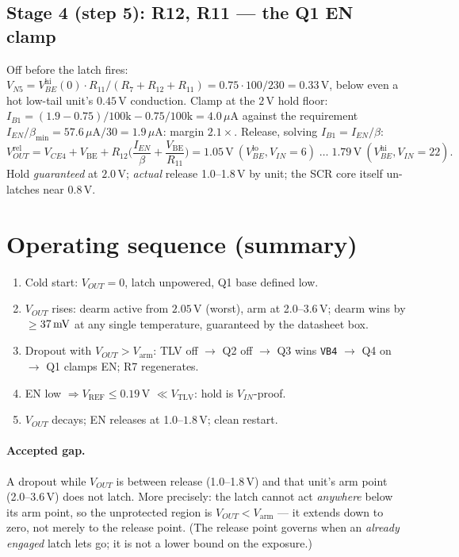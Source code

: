 \documentclass[11pt]{article}
\newcommand{\volt}{\mathrm{V}}\newcommand{\ampere}{\mathrm{A}}
\newcommand{\SI}[2]{\ensuremath{#1\,#2}}
\newcommand{\Vref}{V_{\mathrm{REF}}}
\newcommand{\Vtlv}{V_{\mathrm{TLV}}}
\newcommand{\Vbe}{V_{\mathrm{BE}}}
\newcommand{\Vout}{V_{OUT}}
\newcommand{\Vin}{V_{IN}}
\newcommand{\Varm}{V_{\mathrm{arm}}}
\newcommand{\uA}{\,\mu\mathrm{A}}
\newcommand{\vlo}{V_{BE}^{\mathrm{lo}}}
\newcommand{\vhi}{V_{BE}^{\mathrm{hi}}}
\begin{document}
\subsection{Stage 4 (step 5): R12, R11 --- the Q1 EN clamp}

Off before the latch fires: $V_{N5}=\vhi(0)\cdot R_{11}/(R_7{+}R_{12}{+}R_{11})
=0.75\cdot100/230=\SI{0.33}{\volt}$, below even a hot low-tail unit's
\SI{0.45}{\volt} conduction. Clamp at the \SI{2}{\volt} hold floor:
$I_{B1}=(1.9-0.75)/100\mathrm{k}-0.75/100\mathrm{k}=4.0\uA$ against the
requirement $I_{EN}/\beta_{\min}=57.6\uA/30=1.9\uA$: margin $2.1\times$.
Release, solving $I_{B1}=I_{EN}/\beta$:
\begin{equation}
\Vout^{\mathrm{rel}}=V_{CE4}+\Vbe+R_{12}\Big(\frac{I_{EN}}{\beta}
+\frac{\Vbe}{R_{11}}\Big)
=\SI{1.05}{\volt}\ (\vlo,\Vin{=}6)\;\ldots\;\SI{1.79}{\volt}\ (\vhi,\Vin{=}22).
\end{equation}
Hold \emph{guaranteed} at \SI{2.0}{\volt}; \emph{actual} release 1.0--1.8\,V by
unit; the SCR core itself un-latches near \SI{0.8}{\volt}.

\section{Operating sequence (summary)}

\begin{enumerate}[nosep]
\item Cold start: $\Vout=0$, latch unpowered, Q1 base defined low.
\item $\Vout$ rises: dearm active from \SI{2.05}{\volt} (worst), arm at
      2.0--\SI{3.6}{\volt}; dearm wins by $\ge$\SI{37}{\milli\volt} at any
      single temperature, guaranteed by the datasheet box.
\item Dropout with $\Vout>\Varm$: TLV off $\to$ Q2 off $\to$ Q3 wins
      \texttt{VB4} $\to$ Q4 on $\to$ Q1 clamps EN; R7 regenerates.
\item EN low $\Rightarrow\Vref\le0.19$\,V $\ll\Vtlv$: hold is $\Vin$-proof.
\item $\Vout$ decays; EN releases at 1.0--\SI{1.8}{\volt}; clean restart.
\end{enumerate}

\paragraph{Accepted gap.} A dropout while $\Vout$ is between release
(1.0--1.8\,V) and that unit's arm point (2.0--3.6\,V) does not latch. More
precisely: the latch cannot act \emph{anywhere} below its arm point, so the
unprotected region is $\Vout<\Varm$ --- it extends down to zero, not merely to
the release point. (The release point governs when an \emph{already engaged}
latch lets go; it is not a lower bound on the exposure.)
\end{document}
